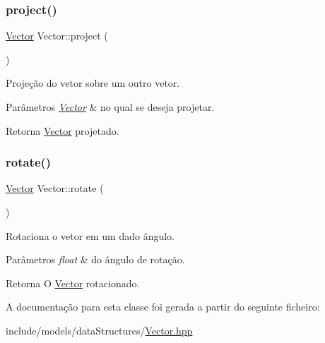\subsubsection{\texorpdfstring{project()}{project()}}
{\footnotesize\ttfamily \mbox{\hyperlink{classVector}{Vector}} Vector\+::project (\begin{DoxyParamCaption}\item[{\mbox{\hyperlink{classVector}{Vector}}}]{ }\end{DoxyParamCaption})}

Projeção do vetor sobre um outro vetor. 
\begin{DoxyParams}{Parâmetros}
{\em \mbox{\hyperlink{classVector}{Vector}}} & no qual se deseja projetar. \\
\hline
\end{DoxyParams}
\begin{DoxyReturn}{Retorna}
\mbox{\hyperlink{classVector}{Vector}} projetado. 
\end{DoxyReturn}
\mbox{\label{classVector_ac2e3094ce0134c3509ce4ef7df78245a}} 
\subsubsection{\texorpdfstring{rotate()}{rotate()}}
{\footnotesize\ttfamily \mbox{\hyperlink{classVector}{Vector}} Vector\+::rotate (\begin{DoxyParamCaption}\item[{float}]{ }\end{DoxyParamCaption})}

Rotaciona o vetor em um dado ângulo. 
\begin{DoxyParams}{Parâmetros}
{\em float} & do ângulo de rotação. \\
\hline
\end{DoxyParams}
\begin{DoxyReturn}{Retorna}
O \mbox{\hyperlink{classVector}{Vector}} rotacionado. 
\end{DoxyReturn}


A documentação para esta classe foi gerada a partir do seguinte ficheiro\+:\begin{DoxyCompactItemize}
\item 
include/models/data\+Structures/\mbox{\hyperlink{Vector_8hpp}{Vector.\+hpp}}\end{DoxyCompactItemize}
